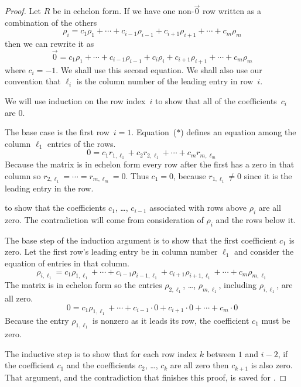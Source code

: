 \begin{proof}
Let $R$ be in echelon form.
If we have one non-\( \vec{0} \) row written as a combination
of the others
\begin{equation*}
   \rho_i=c_1\rho_1+\cdots+c_{i-1}\rho_{i-1}+
               c_{i+1}\rho_{i+1}+\cdots+c_m\rho_m
\end{equation*}
then we can rewrite it as
\begin{equation*}
   \vec{0}=c_1\rho_1+\cdots+c_{i-1}\rho_{i-1}+c_i\rho_i+
               c_{i+1}\rho_{i+1}+\cdots+c_m\rho_m
  \tag{*}
\end{equation*}
where $c_i=-1$.
We shall use this second equation.
We shall also use our convention that $\ell_i$ is the column number of 
the leading entry in row~$i$.

We will use induction on the row index~$i$
to show that all of the coefficients~$c_i$ are $0$.

The base case is the first row~$i=1$.
Equation~($*$) defines an equation among the column $\ell_1$ entries of the 
rows. 
\begin{equation*}
  0=c_1r_{1,\ell_1}+c_2r_{2,\ell_1}+\cdots+c_mr_{m,\ell_m}
\end{equation*}
Because the matrix is in echelon form
every row after the first has a zero in that column so 
$r_{2,\ell_1}=\cdots=r_{m,\ell_m}=0$.
Thus $c_1=0$, because $r_{1,\ell_1}\neq 0$ since it is the leading entry
in the row.



to show that the coefficients 
$c_1$, \ldots, $c_{i-1}$ associated with rows above $\rho_i$ are all zero.
The contradiction will come from consideration of $\rho_i$ and the rows below
it.

The base step of the induction argument 
is to show that the first coefficient $c_1$ is zero.
Let the first row's leading entry be in column number \( \ell_1 \) 
and consider the equation of entries in that column.
\begin{equation*}
   \rho_{i,\ell_1}=c_1\rho_{1,\ell_1}+\cdots+c_{i-1}\rho_{i-1,\ell_1}
               +c_{i+1}\rho_{i+1,\ell_1}+\cdots+c_m\rho_{m,\ell_1}
\end{equation*}
The matrix is in echelon form so the entries 
$\rho_{2,\ell_1}$, \ldots, $\rho_{m,\ell_1}$, including
$\rho_{i,\ell_1}$, are all zero. 
\begin{equation*}
   0=c_1\rho_{1,\ell_1}+\cdots+c_{i-1}\cdot 0
               +c_{i+1}\cdot 0+\cdots+c_m\cdot 0
\end{equation*}
Because the entry $\rho_{1,\ell_1}$ is nonzero as it leads its row,
the coefficient $c_1$ must be zero.  

The inductive step is to show that 
for each row index $k$ between $1$ and $i-2$,
if the coefficient $c_1$ and the 
coefficients $c_2$, \ldots, $c_{k}$ are all zero 
then $c_{k+1}$ is also zero.
That argument,
and the contradiction that finishes this proof, is saved for 
.
\end{proof}

